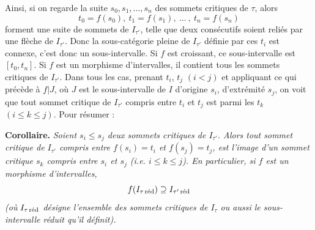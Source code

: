 Ainsi, si on regarde la suite $s_0,s_1,\ldots,s_n$ des sommets critiques de $\tau$, alors
\[
t_0=f(s_0),\ t_1=f(s_1),\ \ldots\ ,\ t_n=f(s_n)
\]
forment une suite de sommets de $I_{\tau'}$, telle que deux consécutifs soient reliés par une flèche de $I_{\tau'}$. Donc la sous-catégorie pleine de $I_{\tau'}$ définie par ces $t_i$ est connexe, c'est donc un sous-intervalle. Si $f$ est croissant, ce sous-intervalle est $[t_0,t_n]$. Si $f$ est un morphisme d'intervalles, il contient tous les sommets critiques de $I_{\tau'}$. Dans tous les cas, prenant $t_i$, $t_j$ $(i<j)$ et appliquant ce qui précède à $f|J$, où $J$ est le sous-intervalle de $I$ d'origine $s_i$, d'extrémité $s_j$, on voit que tout sommet critique de $I_{\tau'}$ compris entre $t_i$ et $t_j$ est parmi les $t_k$ $(i\leq k\leq j)$. Pour résumer :

\textbf{Corollaire.} \textit{Soient $s_i\leq s_j$ deux sommets critiques de $I_{\tau'}$. Alors tout sommet critique de $I_{\tau'}$ compris entre $f(s_i)=t_i$ et $f(s_j)=t_j$, est l'image d'un sommet critique $s_k$ compris entre $s_i$ et $s_j$ (i.e. $i\leq k\leq j$). En particulier, si $f$ est un morphisme d'intervalles,} %
\[
f(I_{\tau\,\red})\supseteq I_{\tau'\,\red}
\]
\textit{(où $I_{\tau\,\red}$ désigne l'ensemble des sommets critiques de $I_\tau$ ou aussi le sous-intervalle réduit qu'il définit).}

